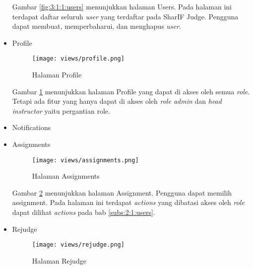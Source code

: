 \begin{itemize}
            Gambar \ref{fig:3:1:1:users} menunjukkan halaman Users. Pada halaman ini terdapat daftar seluruh \textit{user} yang terdaftar pada SharIF Judge. Pengguna dapat membuat, memperbaharui, dan menghapus \textit{user}.

      \item Profile
            \begin{figure}[H]
                  \centering
                  \texttt{[image: views/profile.png]}
                  \caption{Halaman Profile}
                  \label{fig:3:1:1:profile}
            \end{figure}

            Gambar \ref{fig:3:1:1:profile} menunjukkan halaman Profile yang dapat di akses oleh semua \textit{role}. Tetapi ada fitur yang hanya dapat di akses oleh \textit{role admin} dan \textit{head instructor} yaitu pergantian role.

      \item Notifications

      \item Assignments
            \begin{figure}[H]
                  \centering
                  \texttt{[image: views/assignments.png]}
                  \caption{Halaman Assignments}
                  \label{fig:3:1:1:assignments}
            \end{figure}

            Gambar \ref{fig:3:1:1:assignments} menunjukkan halaman Assignment. Pengguna dapat memilih assignment. Pada halaman ini terdapat \textit{actions} yang dibatasi akses oleh \textit{role} dapat dilihat \textit{actions} pada bab \ref{subs:2:1:users}.

      \item Rejudge
            \begin{figure}[H]
                  \centering
                  \texttt{[image: views/rejudge.png]}
                  \caption{Halaman Rejudge}
                  \label{fig:3:1:1:rejudge}
            \end{figure}


\end{itemize}
